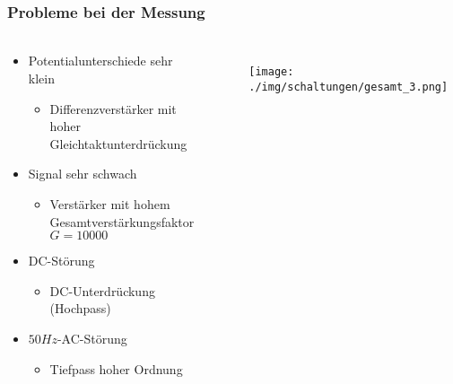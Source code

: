 \begin{frame}
    \frametitle{Probleme bei der Messung}
    \framesubtitle{}
    \begin{columns}[c]
    \begin{block}{}
        \begin{itemize}
            \item Potentialunterschiede sehr klein
            \begin{itemize}
                \item Differenzverstärker mit hoher
                Gleichtaktunterdrückung
            \end{itemize}
            \item Signal sehr schwach
                \begin{itemize}
                    \item Verstärker mit hohem Gesamtverstärkungsfaktor $G=10000$
                \end{itemize}
            \item DC-Störung
                \begin{itemize}
                    \item DC-Unterdrückung (Hochpass)
                \end{itemize}
            \item $50Hz$-AC-Störung
            \pause
                \begin{itemize}
                    \item Tiefpass hoher Ordnung
                \end{itemize}
        \end{itemize}
    \end{block}
    \begin{figure}[H]
    \begin{center}
            \texttt{[image: ./img/schaltungen/gesamt\_3.png]}
    \end{center}
    \end{figure}
    \end{columns}
\end{frame}


